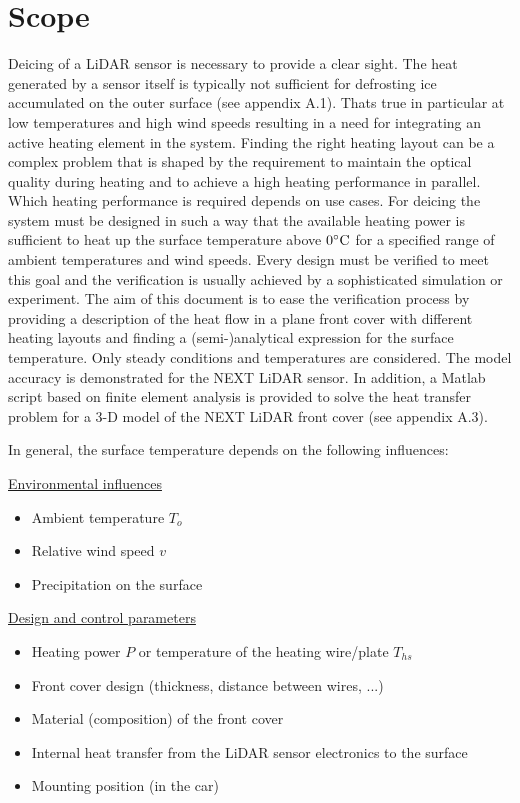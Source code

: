 \section{Scope}
Deicing of a LiDAR sensor is necessary to provide a clear sight. The heat generated by a sensor itself is typically not sufficient for defrosting ice accumulated on the outer surface (see appendix A.1). Thats true in particular at low temperatures and high wind speeds resulting in a need for integrating an active heating element in the system. Finding the right heating layout can be a complex problem that is shaped by the requirement to maintain the optical quality during heating and to achieve a high heating performance in parallel. Which heating performance is required depends on use cases. For deicing the system must be designed in such a way that the available heating power is sufficient to heat up the surface temperature above \(0\dC\) for a specified range of ambient temperatures and wind speeds. Every design must be verified to meet this goal and the verification is usually achieved by a sophisticated simulation or experiment. The aim of this document is to ease the verification process by providing a description of the heat flow in a plane front cover with different heating layouts and finding a (semi-)analytical expression for the surface temperature. Only steady conditions and temperatures are considered. The model accuracy is demonstrated for the NEXT LiDAR sensor. In addition, a Matlab script based on finite element analysis is provided to solve the heat transfer problem for a 3-D model of the NEXT LiDAR front cover (see appendix A.3). 

In general, the surface temperature depends on the following influences:

\underline{Environmental influences}
\begin{itemize}
\item Ambient temperature \(T_{o}\)
\item Relative wind speed \(v\)
\item Precipitation on the surface
\end{itemize}

\underline{Design and control parameters}
\begin{itemize}
\item Heating power \(P\) or temperature of the heating wire/plate \(T_{hs}\)
\item Front cover design (thickness, distance between wires, ...)
\item Material (composition) of the front cover
\item Internal heat transfer from the LiDAR sensor electronics to the surface
\item Mounting position (in the car)
\end{itemize}

